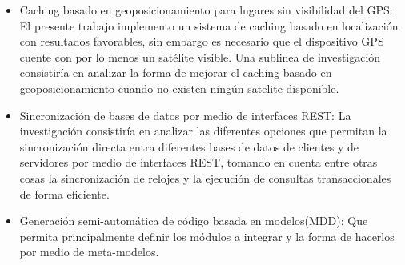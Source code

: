 \documentclass[12pt,a4paper,spanish,openany]{book}
\begin{document}
\begin{itemize}
  \item Caching basado en geoposicionamiento para lugares sin visibilidad del
  GPS: El presente trabajo implemento un sistema de caching basado en
  localización con resultados favorables, sin embargo es necesario que el
  dispositivo GPS cuente con por lo menos un satélite visible. Una sublinea de
  investigación consistiría en analizar la forma de mejorar el caching basado en geoposicionamiento cuando no existen ningún satelite disponible.
  \item Sincronización de bases de datos por medio de interfaces REST: La
  investigación consistiría en analizar las diferentes opciones que permitan la
  sincronización directa entra diferentes bases de datos de clientes y de
  servidores por medio de interfaces REST, tomando en cuenta entre otras cosas
  la sincronización de relojes y la ejecución de consultas transaccionales de
  forma eficiente.
  \item Generación semi-automática de código basada en modelos(MDD): Que permita
  principalmente definir los módulos a integrar y la forma de hacerlos por medio
  de meta-modelos.
\end{itemize}












\fussy



\end{document}
